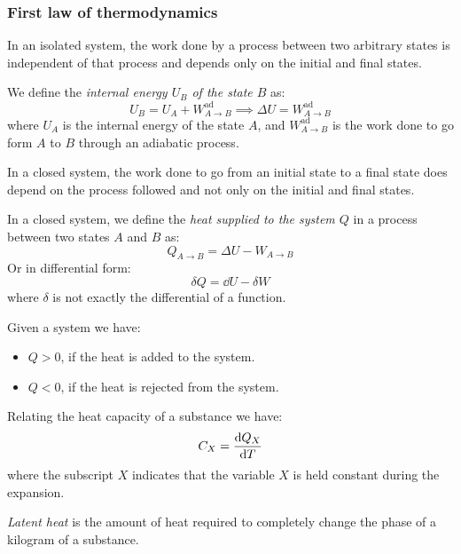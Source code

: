 \documentclass[../../../main.tex]{subfiles}
\begin{document}
\begin{multicols}{2}
  \subsubsection*{First law of thermodynamics}
  \begin{law}
    In an isolated system, the work done by a process between two arbitrary states is independent of that process and depends only on the initial and final states.
  \end{law}
  \begin{corollary}
    We define the \textit{internal energy $U_B$ of the state $B$} as:
    $$U_B=U_A+W_{A\to B}^\text{ad}\implies \Delta U=W_{A\to B}^\text{ad}$$
    where $U_A$ is the internal energy of the state $A$, and $W_{A\to B}^\text{ad}$ is the work done to go form $A$ to $B$ through an adiabatic process.
  \end{corollary}
  \begin{law}
    In a closed system, the work done to go from an initial state to a final state does depend on the process followed and not only on the initial and final states.
  \end{law}
  \begin{corollary}
    In a closed system, we define the \textit{heat supplied to the system $Q$} in a process between two states $A$ and $B$ as:
    $$Q_{A\to B}=\Delta U-W_{A\to B}$$
    Or in differential form:
    $$\delta Q=\dd U-\delta W$$
    where $\delta$ is not exactly the differential of a function.
  \end{corollary}
  \begin{lemma}
    Given a system we have:
    \begin{itemize}
      \item $Q>0$, if the heat is added to the system.
      \item $Q<0$, if the heat is rejected from the system.
    \end{itemize}
  \end{lemma}
  \begin{definition}
    Relating the heat capacity of a substance we have: $$C_X=\dv{Q_X}{T}$$
    where the subscript $X$ indicates that the variable $X$ is held constant during the expansion.
  \end{definition}
  \begin{definition}
    \textit{Latent heat} is the amount of heat required to completely change the phase of a kilogram of a substance.

\end{definition}
\end{multicols}
\end{document}
